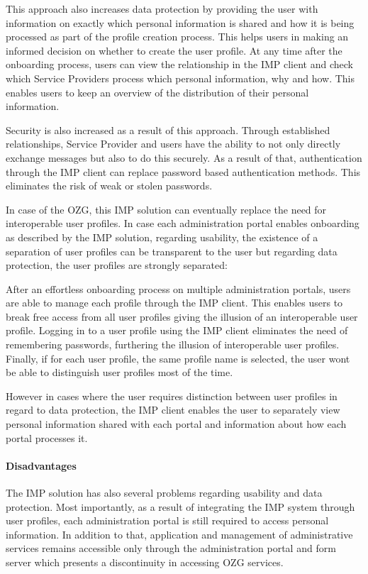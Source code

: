 This approach also increases data protection by providing the user with information on exactly which personal information is shared and how it is being processed as part of the profile creation process. This helps users in making an informed decision on whether to create the user profile. At any time after the onboarding process, users can view the relationship in the IMP client and check which Service Providers process which personal information, why and how. This enables users to keep an overview of the distribution of their personal information.

Security is also increased as a result of this approach. Through established relationships, Service Provider and users have the ability to not only directly exchange messages but also to do this securely. As a result of that, authentication through the IMP client can replace password based authentication methods. This eliminates the risk of weak or stolen passwords.

In case of the OZG, this IMP solution can eventually replace the need for interoperable user profiles. In case each administration portal enables onboarding as described by the IMP solution, regarding usability, the existence of a separation of user profiles can be transparent to the user but regarding data protection, the user profiles are strongly separated:

After an effortless onboarding process on multiple administration portals, users are able to manage each profile through the IMP client. This enables users to break free access from all user profiles giving the illusion of an interoperable user profile. Logging in to a user profile using the IMP client eliminates the need of remembering passwords, furthering the illusion of interoperable user profiles. Finally, if for each user profile, the same profile name is selected, the user wont be able to distinguish user profiles most of the time.

However in cases where the user requires distinction between user profiles in regard to data protection, the IMP client enables the user to separately view personal information shared with each portal and information about how each portal processes it.

\paragraph{Disadvantages}

The IMP solution has also several problems regarding usability and data protection. Most importantly, as a result of integrating the IMP system through user profiles, each administration portal is still required to access personal information. In addition to that, application and management of administrative services remains accessible only through the administration portal and form server which presents a discontinuity in accessing OZG services.
